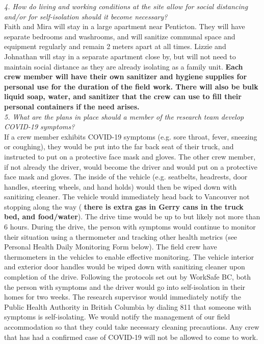 \documentclass[11pt,letter]{article}
\begin{document}
\emph{4. How do living and working conditions at the site allow for social distancing and/or for self-isolation should it become necessary?}\\
Faith and Mira will stay in a large apartment near Penticton. They will have separate bedrooms and washrooms, and will sanitize communal space and equipment regularly and remain 2 meters apart at all times. Lizzie and Johnathan will stay in a separate apartment close by, but will not need to maintain social distance as they are already isolating as a family unit. \textbf{Each crew member will have their own sanitizer and hygiene supplies for personal use for the duration of the field work. There will also be bulk liquid soap, water, and sanitizer that the crew can use to fill their personal containers if the need arises.}\\

\emph{5. What are the plans in place should a member of the research team develop COVID-19 symptoms?}\\
If a crew member exhibits COVID-19 symptoms (e.g. sore throat, fever, sneezing or coughing), they would be put into the far back seat of their truck, and instructed to put on a protective face mask and gloves. The other crew member, if not already the driver, would become the driver and would put on a protective face mask and gloves. The inside of the vehicle (e.g. seatbelts, headrests, door handles, steering wheels, and hand holds) would then be wiped down with sanitizing cleaner. The vehicle would immediately head back to Vancouver not stopping along the way ( \textbf{there is extra gas in Gerry cans in the truck bed, and food/water}). The drive time would be up to but likely not more than 6 hours. During the drive, the person with symptoms would continue to monitor their situation using a thermometer and tracking other health metrics (see Personal Health Daily Monitoring Form below). The field crew have thermometers in the vehicles to enable effective monitoring. The vehicle interior and exterior door handles would be wiped down with sanitizing cleaner upon completion of the drive. Following the protocols set out by WorkSafe BC, both the person with symptoms and the driver would go into self-isolation in their homes for two weeks. The research supervisor would immediately notify the Public Health Authority in British Columbia by dialing 811 that someone with symptoms is self-isolating. We would notify the management of our field accommodation so that they could take necessary cleaning precautions. Any crew that has had a confirmed case of COVID-19 will not be allowed to come to work.\\
\end{document}
